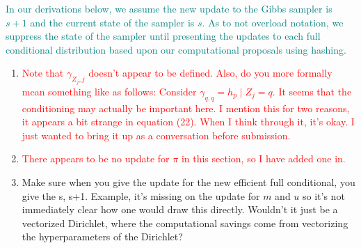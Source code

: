 \documentclass[ba]{imsart}
\begin{document}
\textcolor{teal}{In our derivations below, we assume the new update to the Gibbs sampler is $s+1$ and the current state of the sampler is $s.$ As to not overload notation, we suppress the state of the sampler until presenting the updates to each full conditional distribution based upon our computational proposals using hashing.} 

\begin{enumerate}	
\item \textcolor{red}{Note that 	$\gamma_{Z_j, j}$ doesn't appear to be defined. Also, do you more formally mean something like as follows: Consider $\gamma_{q,q} = h_p \mid Z_j = q$. It seems that the conditioning may actually be important here. I mention this for two reasons, it appears a bit strange in equation (22). When I think through it, it's okay. I just wanted to bring it up as a conversation before submission.}
\item \textcolor{red}{There appears to be no update for $\pi$ in this section, so I have added one in.}
\item Make sure when you give the update for the new efficient full conditional, you give the s, s+1. Example, it's missing on the update for $m$ and $u$ so it's not immediately clear how one would draw this directly. Wouldn't it just be a vectorized Dirichlet, where the computational savings come from vectorizing the hyperparameters of the Dirichlet?
\end{enumerate}
\end{document}

